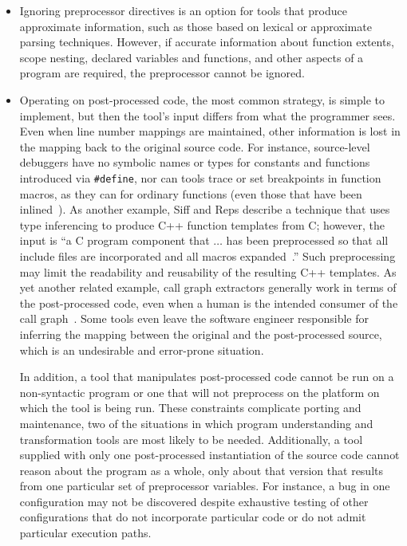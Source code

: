 \documentclass[10pt]{article}
\begin{document}
\begin{itemize}

\item Ignoring preprocessor directives is an option for tools that produce
approximate information, such as those based on lexical or approximate parsing
techniques.  However, if accurate information about function extents,
scope nesting, declared variables and functions, and other aspects of
a program are required, the preprocessor cannot be ignored.

\item Operating on post-processed code, the most common strategy, is
simple to implement, but then the tool's input differs from what the
programmer sees.  Even when line number mappings are maintained, other
information is lost in the mapping back to the original source code.
For instance, source-level debuggers have no symbolic names or types
for constants and functions introduced via {\tt \#define}, nor can
tools trace or set breakpoints in function macros, as they can for
ordinary functions (even those that have been
inlined~\cite{Zellweger83:TR}).  As another example, Siff and Reps
describe a technique that uses type inferencing to produce C++
function templates from C; however, the input is ``a C program
component that $\ldots$ has been preprocessed so that all include
files are incorporated and all macros
expanded~\cite[p.~145]{Siff-fse96}.''  Such preprocessing may limit
the readability and reusability of the resulting C++ templates.  As
yet another related example, call graph extractors generally work in
terms of the post-processed code, even when a human is the intended
consumer of the call graph~\cite{Murphy-icse18}.  Some tools even
leave the software engineer responsible for inferring the mapping
between the original and the post-processed source, which is an
undesirable and error-prone situation.

In addition, a tool that manipulates post-processed code cannot be run
on a non-syntactic program or one that will not preprocess on the
platform on which the tool is being run.  These constraints complicate
porting and maintenance, two of the situations in which program
understanding and transformation tools are most likely to be needed.
Additionally, a tool supplied with only one post-processed
instantiation of the source code cannot reason about the program as a
whole, only about that version that results from one particular set of
preprocessor variables.  For instance, a bug in one configuration may
not be discovered despite exhaustive testing of other configurations
that do not incorporate particular code or do not admit particular
execution paths.


\end{itemize}
\end{document}

